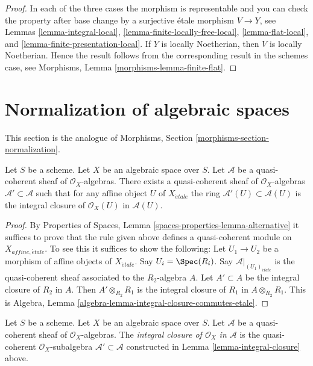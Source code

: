 \begin{proof}
In each of the three cases the morphism is representable and you
can check the property after base change by a surjective \'etale morphism
$V \to Y$, see
Lemmas \ref{lemma-integral-local},
\ref{lemma-finite-locally-free-local},
\ref{lemma-flat-local}, and
\ref{lemma-finite-presentation-local}.
If $Y$ is locally Noetherian, then $V$ is locally Noetherian.
Hence the result follows from the corresponding result
in the schemes case, see
Morphisms, Lemma \ref{morphisms-lemma-finite-flat}.
\end{proof}







\section{Normalization of algebraic spaces}
\label{section-normalization}

\noindent
This section is the analogue of
Morphisms, Section \ref{morphisms-section-normalization}.

\begin{lemma}
\label{lemma-integral-closure}
Let $S$ be a scheme. Let $X$ be an algebraic space over $S$.
Let $\mathcal{A}$ be a quasi-coherent sheaf of $\mathcal{O}_X$-algebras.
There exists a quasi-coherent sheaf of $\mathcal{O}_X$-algebras
$\mathcal{A}' \subset \mathcal{A}$ such that
for any affine object $U$ of $X_{\acute{e}tale}$ the ring
$\mathcal{A}'(U) \subset \mathcal{A}(U)$ is
the integral closure of $\mathcal{O}_X(U)$ in $\mathcal{A}(U)$.
\end{lemma}

\begin{proof}
By Properties of Spaces, Lemma \ref{spaces-properties-lemma-alternative}
it suffices to prove that the rule given above defines a quasi-coherent
module on $X_{affine, \acute{e}tale}$. To see this it suffices
to show the following: Let $U_1 \to U_2$ be a morphism of affine objects of
$X_{\acute{e}tale}$. Say $U_i = \Spec(R_i)$.
Say $\mathcal{A}|_{(U_1)_{\acute{e}tale}}$
is the quasi-coherent sheaf associated to
the $R_2$-algebra $A$. Let $A' \subset A$ be the integral closure
of $R_2$ in $A$. Then $A' \otimes_{R_2} R_1$ is the integral closure
of $R_1$ in $A \otimes_{R_2} R_1$. This is
Algebra, Lemma \ref{algebra-lemma-integral-closure-commutes-etale}.
\end{proof}

\begin{definition}
\label{definition-integral-closure}
Let $S$ be a scheme. Let $X$ be an algebraic space over $S$.
Let $\mathcal{A}$ be a quasi-coherent sheaf of $\mathcal{O}_X$-algebras.
The {\it integral closure of $\mathcal{O}_X$ in $\mathcal{A}$} is the
quasi-coherent $\mathcal{O}_X$-subalgebra $\mathcal{A}' \subset \mathcal{A}$
constructed in Lemma \ref{lemma-integral-closure} above.
\end{definition}

